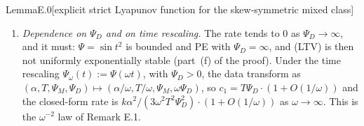 \begin{thm}{Lemma}{E.0}[explicit strict Lyapunov function for the skew-symmetric mixed class]
\begin{enumerate}[label=(\roman*)]
    \[
      \norm{w(t)}\le\sqrt3\cdot e^{-(2\gamma/3)(t-t_0)}\cdot\norm{w(t_0)}\qquad\text{for all }t\ge t_0\ge0.
    \]
  \item \emph{Dependence on $\Psi_D$ and on time rescaling.} The rate tends to $0$ as $\Psi_D\to\infty$, and it must:
    $\Psi=\sin t^2$ is bounded and PE with $\Psi_D=\infty$, and \textup{(LTV)} is then not uniformly exponentially
    stable (part~(f) of the proof). Under the time rescaling $\Psi_\omega(t):=\Psi(\omega t)$, with $\Psi_D>0$, the
    data transform as $(\alpha,T,\Psi_M,\Psi_D)\mapsto(\alpha/\omega,T/\omega,\Psi_M,\omega\Psi_D)$, so
    $c_1=T\Psi_D\cdot(1+O(1/\omega))$ and the closed-form rate is
    $k\alpha^2/(3\omega^2T^2\Psi_D^2)\cdot(1+O(1/\omega))$ as $\omega\to\infty$. This is the $\omega^{-2}$ law of
    Remark E.1.
\end{enumerate}
\end{thm}

